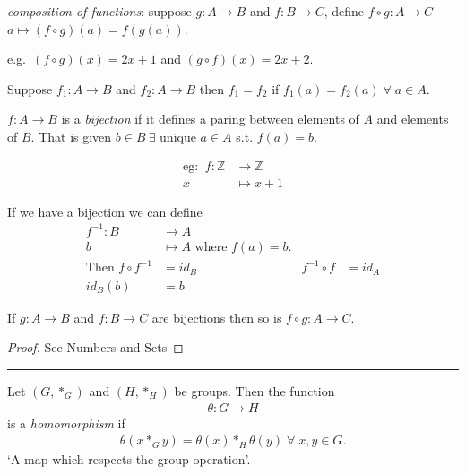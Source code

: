 \emph{composition of functions}:
suppose \(g: A \to B\) and \(f: B \to C\), define \(f \circ g: A \to C\) \(a \mapsto (f \circ g)(a) = f(g(a))\).

e.g.~\((f \circ g)(x) = 2x + 1\) and \((g \circ f)(x) = 2x + 2\).

Suppose \(f_1: A \to B\) and \(f_2: A \to B\) then \(f_1 = f_2\) if \(f_1(a) = f_2(a) \; \forall \; a \in A\).

\(f: A \to B\) is a \emph{bijection} if it defines a paring between elements of \(A\) and elements of \(B\). That is given \(b \in B \ \exists\) unique \(a \in A\) s.t. \(f(a) = b\).

\begin{align*}
    \text{eg: }\ f: \mathbb{Z} &\to \mathbb{Z} \\
    x &\mapsto x + 1
\end{align*}

If we have a bijection we can define
\begin{align*}
    f^{-1}: B &\to A \\
    b &\mapsto A \text{ where } f(a) = b. \\
    \text{Then } f \circ f^{-1} &= id_B & f^{-1} \circ f &= id_A\\
    id_B(b) &= b
\end{align*}

\begin{lemma}
\protect\hypertarget{lem:two}{}\label{lem:two}If \(g: A \to B\) and \(f: B \to C\) are bijections then so is \(f \circ g: A \to C\).
\end{lemma}

\begin{proof}
See Numbers and Sets
\end{proof}

\begin{center}\rule{0.5\linewidth}{0.5pt}\end{center}

\begin{definition}
\protect\hypertarget{def:homomorphism}{}\label{def:homomorphism}Let \((G, *_G)\) and \((H, *_H)\) be groups. Then the function
\begin{align*}
    \theta : G \to H
\end{align*} is a \emph{homomorphism} if
\begin{align*}
    \theta(x *_G y) = \theta(x) *_H \theta(y) \; \forall \; x, y \in G.
\end{align*}
`A map which respects the group operation'.
\end{definition}

